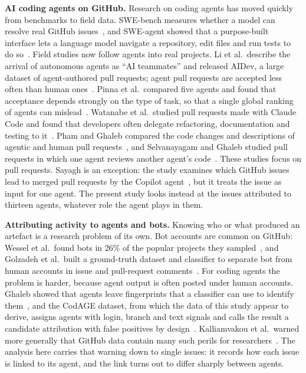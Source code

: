 \label{sec:related}
\textbf{AI coding agents on GitHub.} Research on coding agents has moved quickly from benchmarks to field data. SWE-bench measures whether a model can resolve real GitHub issues~\cite{jimenez2024swebench}, and SWE-agent showed that a purpose-built interface lets a language model navigate a repository, edit files and run tests to do so~\cite{yang2024sweagent}. Field studies now follow agents into real projects. Li et al.\ describe the arrival of autonomous agents as ``AI teammates'' and released AIDev, a large dataset of agent-authored pull requests; agent pull requests are accepted less often than human ones~\cite{li2025aiteammates,li2026aidev}. Pinna et al.\ compared five agents and found that acceptance depends strongly on the type of task, so that a single global ranking of agents can mislead~\cite{pinna2026comparing}. Watanabe et al.\ studied pull requests made with Claude Code and found that developers often delegate refactoring, documentation and testing to it~\cite{watanabe2025agentic}. Pham and Ghaleb compared the code changes and descriptions of agentic and human pull requests~\cite{pham2026alignment}, and Selvanayagam and Ghaleb studied pull requests in which one agent reviews another agent's code~\cite{selvanayagam2026aitoai}. These studies focus on pull requests. Sayagh is an exception: the study examines which GitHub issues lead to merged pull requests by the Copilot agent~\cite{sayagh2025copilot}, but it treats the issue as input for one agent. The present study looks instead at the issues attributed to thirteen agents, whatever role the agent plays in them.

\textbf{Attributing activity to agents and bots.} Knowing who or what produced an artefact is a research problem of its own. Bot accounts are common on GitHub: Wessel et al.\ found bots in 26\% of the popular projects they sampled~\cite{wessel2018bots}, and Golzadeh et al.\ built a ground-truth dataset and classifier to separate bot from human accounts in issue and pull-request comments~\cite{golzadeh2021bots}. For coding agents the problem is harder, because agent output is often posted under human accounts. Ghaleb showed that agents leave fingerprints that a classifier can use to identify them~\cite{ghaleb2026fingerprinting}, and the CodAGE dataset, from which the data of this study appear to derive, assigns agents with login, branch and text signals and calls the result a candidate attribution with false positives by design~\cite{ghaleb2026codage}. Kalliamvakou et al.\ warned more generally that GitHub data contain many such perils for researchers~\cite{kalliamvakou2014promises}. The analysis here carries that warning down to single issues: it records how each issue is linked to its agent, and the link turns out to differ sharply between agents.

